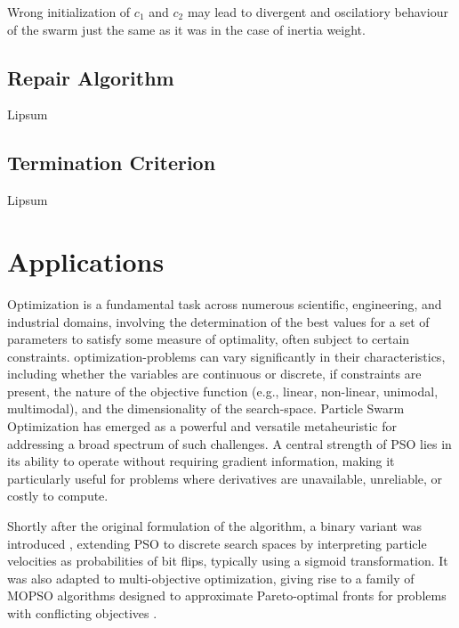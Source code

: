 {Wrong initialization of $c_1$ and $c_2$ may lead to divergent and oscilatiory behaviour of the swarm just the same as it was in the case of inertia weight.








\subsection{Repair Algorithm}

Lipsum

\subsection{Termination Criterion}

Lipsum




\section{Applications}

Optimization is a fundamental task across numerous scientific, engineering, and industrial domains, involving the determination of the best values for a set of parameters to satisfy some measure of optimality, often subject to certain constraints. \Glspl{optimization-problem}  can vary significantly in their characteristics, including whether the variables are continuous or discrete, if constraints are present, the nature of the objective function (e.g., linear, non-linear, unimodal, multimodal), and the dimensionality of the \gls{search-space}.
Particle Swarm Optimization has emerged as a powerful and versatile metaheuristic for addressing a broad spectrum of such challenges. A central strength of PSO lies in its ability to operate without requiring gradient information, making it particularly useful for problems where derivatives are unavailable, unreliable, or costly to compute.

Shortly after the original formulation of the algorithm, a binary variant was introduced \citep{kennedy1997discrete}, extending PSO to discrete search spaces by interpreting particle velocities as probabilities of bit flips, typically using a sigmoid transformation. 
It was also adapted to multi-objective optimization, giving rise to a family of MOPSO algorithms designed to approximate Pareto-optimal fronts for problems with conflicting objectives \citep{alvarezbenitez2005mopso, nebro2009smpsomcdm, shao2025improved}.


}
